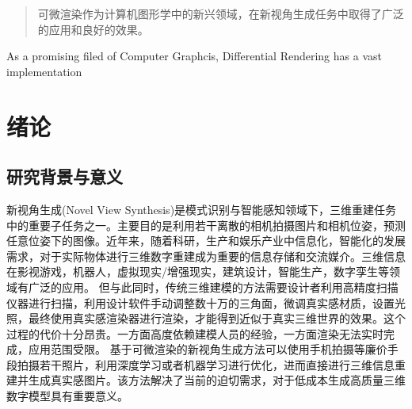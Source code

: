 \documentclass[master,oneside,winfonts]{njuthesis/njuthesis}
\author{朱子航}
\institute{南京大学}
\date{2023年5月13日}
\begin{document}
\maketitle
\makeenglishtitle
{}
\begin{spacing}{1.25}
    \begin{abstract}
        可微渲染作为计算机图形学中的新兴领域，在新视角生成任务中取得了广泛的应用和良好的效果。
    \end{abstract}
\end{spacing}

\begin{spacing}{1.15}
    \begin{englishabstract}
        As a promising filed of Computer Graphcis, Differential Rendering has a vast implementation
    \end{englishabstract}
\end{spacing}
\begin{spacing}{1}
    \renewcommand*\contentsname{目录}
    \tableofcontents
\end{spacing}

\mainmatter
\chapter{绪论}\label{chapter_introduction}
\section{研究背景与意义}
新视角生成(Novel View Synthesis)是模式识别与智能感知领域下，三维重建任务中的重要子任务之一。主要目的是利用若干离散的相机拍摄图片和相机位姿，预测任意位姿下的图像。近年来，随着科研，生产和娱乐产业中信息化，智能化的发展需求，对于实际物体进行三维数字重建成为重要的信息存储和交流媒介。三维信息在影视游戏，机器人，虚拟现实/增强现实，建筑设计，智能生产，数字孪生等领域有广泛的应用。
但与此同时，传统三维建模的方法需要设计者利用高精度扫描仪器进行扫描，利用设计软件手动调整数十万的三角面，微调真实感材质，设置光照，最终使用真实感渲染器进行渲染，才能得到近似于真实三维世界的效果。这个过程的代价十分昂贵。一方面高度依赖建模人员的经验，一方面渲染无法实时完成，应用范围受限。
基于可微渲染的新视角生成方法可以使用手机拍摄等廉价手段拍摄若干照片，利用深度学习或者机器学习进行优化，进而直接进行三维信息重建并生成真实感图片。该方法解决了当前的迫切需求，对于低成本生成高质量三维数字模型具有重要意义。
\end{document}
